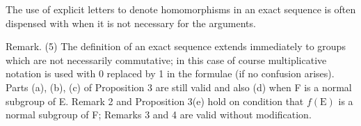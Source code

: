 The use of explicit letters to denote homomorphisms in an exact sequence is often dispensed with when it is not necessary for the arguments.

Remark. (5) The definition of an exact sequence extends immediately to groups which are not necessarily commutative; in this case of course multiplicative notation is used with 0 replaced by 1 in the formulae (if no confusion arises). Parts (a), (b), (c) of Proposition 3 are still valid and also (d) when F is a normal subgroup of E. Remark 2 and Proposition 3(e) hold on condition that \(f(\mathrm{E})\) is a normal subgroup of F; Remarks 3 and 4 are valid without modification.

